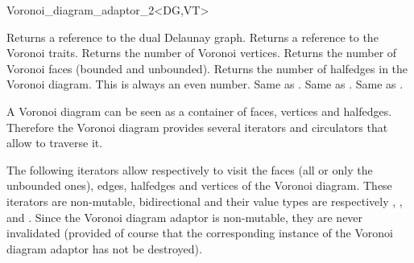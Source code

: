 \begin{ccRefClass}{Voronoi_diagram_adaptor_2<DG,VT>}
\ccCreation
{}
\ccThreeToTwo
%
%


\ccAccessFunctions
%
%
{Returns a reference to the dual Delaunay graph.}
\ccGlue
{}
{Returns a reference to the Voronoi traits.}
\ccGlue
{}
{Returns the number of Voronoi vertices.}
\ccGlue
{}
{Returns the number of Voronoi faces (bounded and unbounded).}
\ccGlue
{}
{Returns the number of halfedges in the Voronoi diagram. This is
  always an even number.}
\ccGlue
{}
{Same as .}
\ccGlue
{}
{Same as .}
\ccGlue
{}
{Same as .}
\ccGlue
{}
%





A Voronoi diagram can be seen as a container of faces, vertices and
halfedges. Therefore the Voronoi diagram provides several iterators
and circulators that allow to traverse it.





The following iterators allow respectively to visit the faces (all or
only the unbounded ones), edges, halfedges and vertices of the Voronoi
diagram. These iterators are non-mutable, bidirectional and their
value types are respectively , ,
 and .
Since the Voronoi diagram adaptor is non-mutable, they are never
invalidated (provided of course that the corresponding instance of the
Voronoi diagram adaptor has not be destroyed).


\end{ccRefClass}
